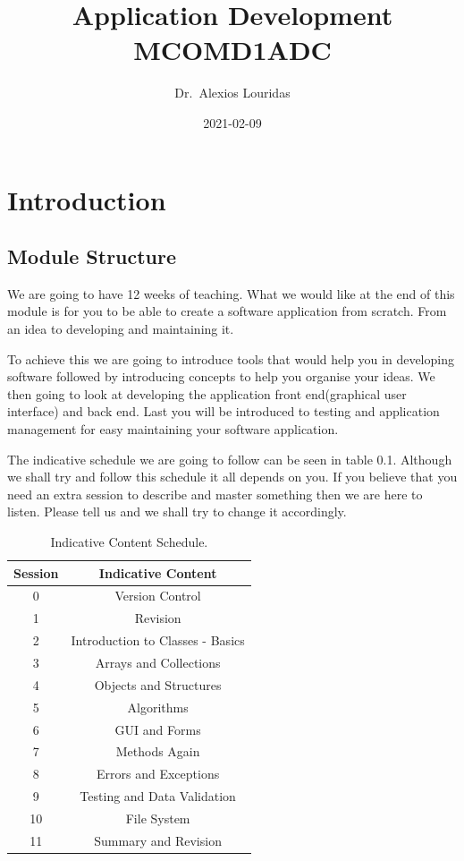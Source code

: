 \documentclass[
]{book}
\title{Application Development MCOMD1ADC}
\author{Dr.~Alexios Louridas}
\date{2021-02-09}
\begin{document}
\maketitle

{
\setcounter{tocdepth}{1}
\tableofcontents
}
\hypertarget{introduction}{%
\chapter*{Introduction}\label{introduction}}

\hypertarget{module-structure}{%
\section*{Module Structure}\label{module-structure}}

We are going to have 12 weeks of teaching. What we would like at the end of this module is for you to be able to create a software application from scratch. From an idea to developing and maintaining it.

To achieve this we are going to introduce tools that would help you in developing software followed by introducing concepts to help you organise your ideas. We then going to look at developing the application front end(graphical user interface) and back end. Last you will be introduced to testing and application management for easy maintaining your software application.

The indicative schedule we are going to follow can be seen in table 0.1. Although we shall try and follow this schedule it all depends on you. If you believe that you need an extra session to describe and master something then we are here to listen. Please tell us and we shall try to change it accordingly.

\begin{table}

\caption{\label{tab:unnamed-chunk-1}Indicative Content Schedule.}
\centering
\begin{tabular}[t]{c|c}
\hline
Session & Indicative Content\\
\hline
0 & Version Control\\
\hline
1 & Revision\\
\hline
2 & Introduction to Classes - Basics\\
\hline
3 & Arrays and Collections\\
\hline
4 & Objects and Structures\\
\hline
5 & Algorithms\\
\hline
6 & GUI and Forms\\
\hline
7 & Methods Again\\
\hline
8 & Errors and Exceptions\\
\hline
9 & Testing and Data Validation\\
\hline
10 & File System\\
\hline
11 & Summary and Revision\\
\hline
\end{tabular}
\end{table}
\end{document}
